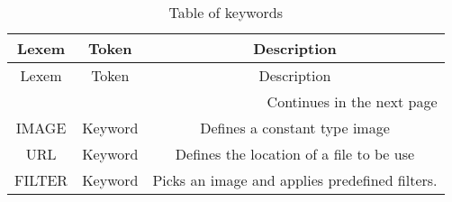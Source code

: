 
\begin{longtable}[c]{|c|c|c|}
\caption{Table of keywords}\\
\hline
    Lexem & Token & Description \\
\hline
\endfirsthead
\hline
    Lexem & Token & Description \\
\hline
\endhead %
\hline \multicolumn{3}{r}{{Continues in the next page}} \\ \hline
\endfoot %
\hline
\endlastfoot %
\hline

\hline
    IMAGE & Keyword & Defines a constant type image \\
    URL & Keyword & Defines the location of a file to be use \\
    FILTER & Keyword & Picks an image and applies predefined filters. \\
\hline

\end{longtable}